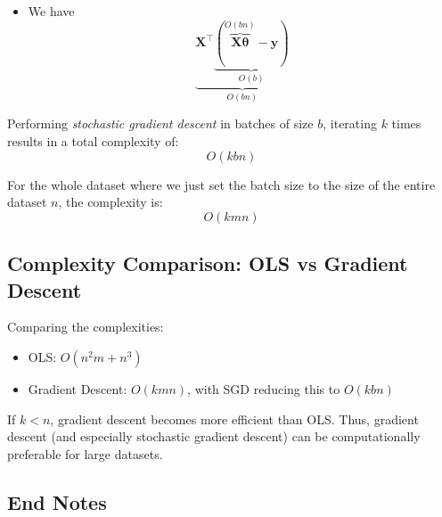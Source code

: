 \begin{enumerate}
\begin{itemize}
\begin{figure}
\begin{tikzpicture}[scale=0.5]
                        \end{tikzpicture}
                    \end{figure}



              \item We have
                    \[
                        \underbrace{\bm{X}^\top \underbrace{(\overbrace{\bm{X}\bm{\theta}}^{O(bn)} - \bm{y})}_{O(b)} }_{O(bn)}
                    \]
          \end{itemize}

          Performing \textit{stochastic gradient descent} in batches of size $b$, iterating \( k \) times results in a total complexity of:
          \[
              O(kbn)
          \]

          For the whole dataset where we just set the batch size to the size of the entire dataset $n$, the complexity is:
          \[
              O(kmn)
          \]

\end{enumerate}

\subsection{Complexity Comparison: OLS vs Gradient Descent}

Comparing the complexities:
\begin{itemize}
    \item OLS: \( O(n^2 m + n^3) \)
    \item Gradient Descent: \( O(kmn) \), with SGD reducing this to \( O(kbn) \)
\end{itemize}

If \( k < n \), gradient descent becomes more efficient than OLS. Thus, gradient descent (and especially stochastic gradient descent) can be computationally preferable for large datasets.


\subsection{End Notes}


